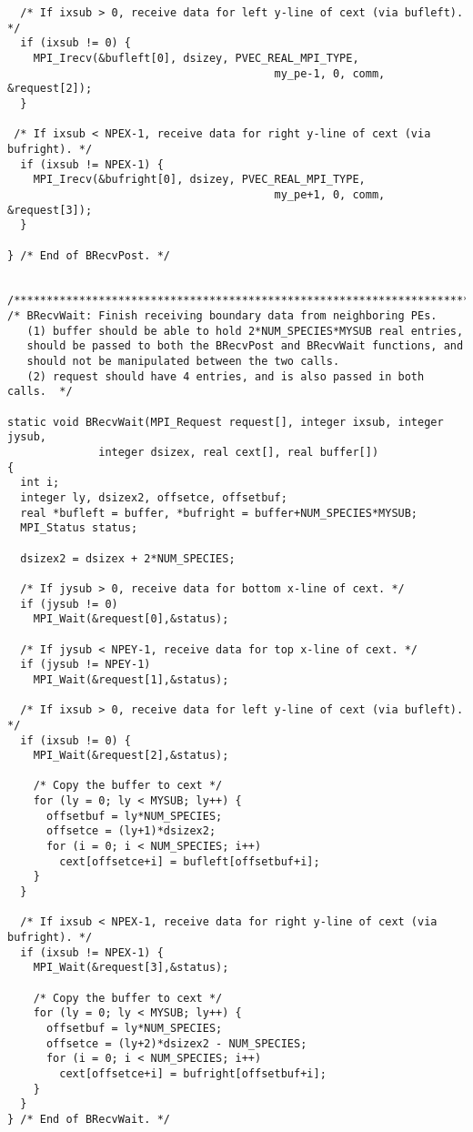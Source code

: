 \begin{verbatim}
  /* If ixsub > 0, receive data for left y-line of cext (via bufleft). */
  if (ixsub != 0) {
    MPI_Irecv(&bufleft[0], dsizey, PVEC_REAL_MPI_TYPE,
                                         my_pe-1, 0, comm, &request[2]);
  }

 /* If ixsub < NPEX-1, receive data for right y-line of cext (via bufright). */
  if (ixsub != NPEX-1) {
    MPI_Irecv(&bufright[0], dsizey, PVEC_REAL_MPI_TYPE,
                                         my_pe+1, 0, comm, &request[3]);
  }

} /* End of BRecvPost. */


/*************************************************************************/
/* BRecvWait: Finish receiving boundary data from neighboring PEs.
   (1) buffer should be able to hold 2*NUM_SPECIES*MYSUB real entries,
   should be passed to both the BRecvPost and BRecvWait functions, and
   should not be manipulated between the two calls.
   (2) request should have 4 entries, and is also passed in both calls.  */

static void BRecvWait(MPI_Request request[], integer ixsub, integer jysub,
		      integer dsizex, real cext[], real buffer[])
{
  int i;
  integer ly, dsizex2, offsetce, offsetbuf;
  real *bufleft = buffer, *bufright = buffer+NUM_SPECIES*MYSUB;
  MPI_Status status;

  dsizex2 = dsizex + 2*NUM_SPECIES;

  /* If jysub > 0, receive data for bottom x-line of cext. */
  if (jysub != 0)
    MPI_Wait(&request[0],&status);

  /* If jysub < NPEY-1, receive data for top x-line of cext. */
  if (jysub != NPEY-1)
    MPI_Wait(&request[1],&status);

  /* If ixsub > 0, receive data for left y-line of cext (via bufleft). */
  if (ixsub != 0) {
    MPI_Wait(&request[2],&status);

    /* Copy the buffer to cext */
    for (ly = 0; ly < MYSUB; ly++) {
      offsetbuf = ly*NUM_SPECIES;
      offsetce = (ly+1)*dsizex2;
      for (i = 0; i < NUM_SPECIES; i++)
        cext[offsetce+i] = bufleft[offsetbuf+i];
    }
  }

  /* If ixsub < NPEX-1, receive data for right y-line of cext (via bufright). */
  if (ixsub != NPEX-1) {
    MPI_Wait(&request[3],&status);

    /* Copy the buffer to cext */
    for (ly = 0; ly < MYSUB; ly++) {
      offsetbuf = ly*NUM_SPECIES;
      offsetce = (ly+2)*dsizex2 - NUM_SPECIES;
      for (i = 0; i < NUM_SPECIES; i++)
        cext[offsetce+i] = bufright[offsetbuf+i];
    }
  }
} /* End of BRecvWait. */
      


\end{verbatim}
